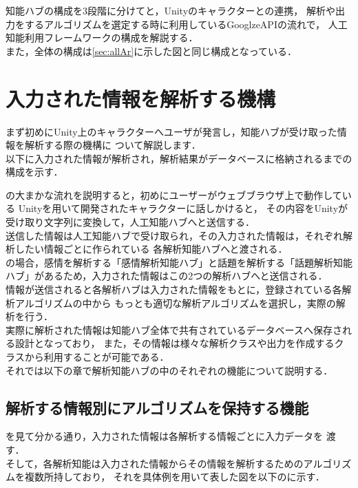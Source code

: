 
知能ハブの構成を3段階に分けてと，Unityのキャラクターとの連携，
解析や出力をするアルゴリズムを選定する時に利用しているGooglzeAPIの流れで，
人工知能利用フレームワークの構成を解説する．
\\
また，全体の構成は\ref{sec:allAr}に示した図と同じ構成となっている．
\section{入力された情報を解析する機構}
まず初めにUnity上のキャラクターへユーザが発言し，知能ハブが受け取った情報を解析する際の機構に
ついて解説します．\\

以下に入力された情報が解析され，解析結果がデータベースに格納されるまでの
構成を示す．

の大まかな流れを説明すると，初めにユーザーがウェブブラウザ上で動作している
Unityを用いて開発されたキャラクターに話しかけると，
その内容をUnityが受け取り文字列に変換して，人工知能ハブへと送信する．
\\
送信した情報は人工知能ハブで受け取られ，その入力された情報は，それぞれ解析したい情報ごとに作られている
各解析知能ハブへと渡される．
\\
の場合，感情を解析する「感情解析知能ハブ」と話題を解析する「話題解析知能
ハブ」があるため，入力された情報はこの2つの解析ハブへと送信される．
\\
情報が送信されると各解析ハブは入力された情報をもとに，登録されている各解析アルゴリズムの中から
もっとも適切な解析アルゴリズムを選択し，実際の解析を行う．
\\
実際に解析された情報は知能ハブ全体で共有されているデータベースへ保存される設計となっており，
また，その情報は様々な解析クラスや出力を作成するクラスから利用することが可能である．
\\
それでは以下の章で解析知能ハブの中のそれぞれの機能について説明する．


\subsection{解析する情報別にアルゴリズムを保持する機能}
を見て分かる通り，入力された情報は各解析する情報ごとに入力データを
渡す．
\\
そして，各解析知能は入力された情報からその情報を解析するためのアルゴリズムを複数所持しており，
それを具体例を用いて表した図を以下のに示す．

